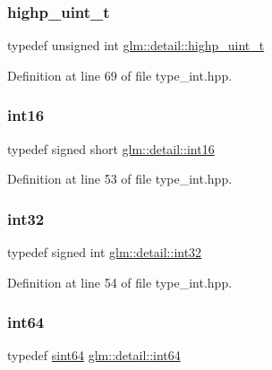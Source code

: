 \subsubsection{\texorpdfstring{highp\_uint\_t}{highp\_uint\_t}}
{\footnotesize\ttfamily typedef unsigned int \mbox{\hyperlink{namespaceglm_1_1detail_a994c05c8a976cc902a7cd193ad36bbba}{glm\+::detail\+::highp\+\_\+uint\+\_\+t}}}



Definition at line 69 of file type\+\_\+int.\+hpp.

\mbox{\label{namespaceglm_1_1detail_a375938874ca4f0a0982ec6373b56117b}} 
\subsubsection{\texorpdfstring{int16}{int16}}
{\footnotesize\ttfamily typedef signed short \mbox{\hyperlink{namespaceglm_1_1detail_a375938874ca4f0a0982ec6373b56117b}{glm\+::detail\+::int16}}}



Definition at line 53 of file type\+\_\+int.\+hpp.

\mbox{\label{namespaceglm_1_1detail_a9f85b4efeca416cdcec2fd08939a2e17}} 
\subsubsection{\texorpdfstring{int32}{int32}}
{\footnotesize\ttfamily typedef signed int \mbox{\hyperlink{namespaceglm_1_1detail_a9f85b4efeca416cdcec2fd08939a2e17}{glm\+::detail\+::int32}}}



Definition at line 54 of file type\+\_\+int.\+hpp.

\mbox{\label{namespaceglm_1_1detail_a5b1c3227ec636c24a0676746381adfc8}} 
\subsubsection{\texorpdfstring{int64}{int64}}
{\footnotesize\ttfamily typedef \mbox{\hyperlink{namespaceglm_1_1detail_aa9fd5478f3e347aa0b2d1a8bf3408544}{sint64}} \mbox{\hyperlink{namespaceglm_1_1detail_a5b1c3227ec636c24a0676746381adfc8}{glm\+::detail\+::int64}}}



